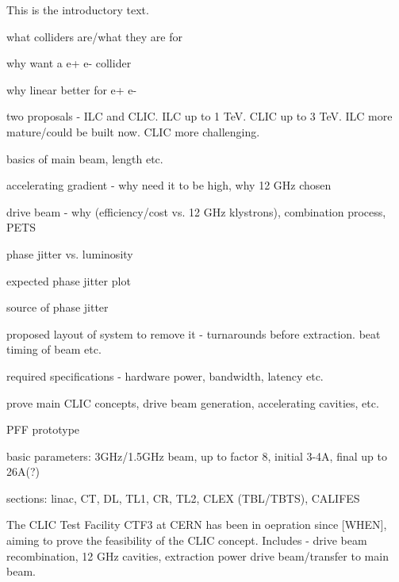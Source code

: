 
This is the introductory text.




what colliders are/what they are for

why want a e+ e- collider

why linear better for e+ e-

two proposals - ILC and CLIC. ILC up to 1 TeV. CLIC up to 3 TeV. ILC more mature/could be built now. CLIC more challenging.


basics of main beam, length etc.

accelerating gradient - why need it to be high, why 12 GHz chosen

drive beam - why (efficiency/cost vs. 12 GHz klystrons), combination process, PETS




phase jitter vs. luminosity

expected phase jitter plot

source of phase jitter

proposed layout of system to remove it - turnarounds before extraction. beat timing of beam etc.

required specifications - hardware power, bandwidth, latency etc.



prove main CLIC concepts, drive beam generation, accelerating cavities, etc.

PFF prototype

basic parameters: 3GHz/1.5GHz beam, up to factor 8, initial 3-4A, final up to 26A(?)

sections: linac, CT, DL, TL1, CR, TL2, CLEX (TBL/TBTS), CALIFES

The CLIC Test Facility CTF3 at CERN has been in oepration since [WHEN], aiming to prove the feasibility of the CLIC concept. Includes - drive beam recombination, 12 GHz cavities, extraction power drive beam/transfer to main beam.

